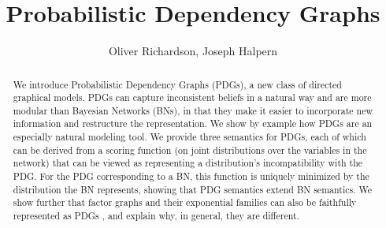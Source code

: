 \documentclass[letterpaper]{article} %
\title{Probabilistic Dependency Graphs}
\author{
	Oliver Richardson, Joseph Halpern \\
}
\theoremstyle{plain}
\theoremstyle{definition}
\theoremstyle{remark}
\begin{document}
\maketitle
\begin{abstract}
We introduce Probabilistic Dependency Graphs (PDGs), a new class of
directed graphical models.   PDGs can capture inconsistent beliefs in a
natural way and are more modular than Bayesian Networks (BNs), in that
they make it easier to incorporate new information and restructure the  
representation.    We show by example how PDGs are an especially natural
modeling tool.
We provide three semantics for PDGs, each of which can be derived from a
scoring function (on joint distributions over the
variables in the network) that can be viewed as representing a
distribution's incompatibility with the PDG.
For the PDG corresponding
to a BN, this function is uniquely minimized by the distribution the
BN represents, showing that PDG semantics extend BN semantics.  
We show further that factor graphs
and their exponential families
can also be faithfully represented as PDGs
, and explain why, in general, they are different.
\end{abstract}
\end{document}
